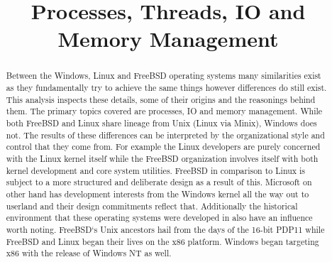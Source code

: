 \documentclass[letterpaper,10pt,draftclsnofoot,onecolumn]{IEEEtran}
\begin{document}
\title{Processes, Threads, IO and Memory Management}

\author{
}

\maketitle
\begin{abstract}
Between the Windows, Linux and FreeBSD operating systems many similarities exist as they fundamentally try to achieve the same things however differences do still exist. This analysis inspects these details, some of their origins and the reasonings behind them. The primary topics covered are processes, IO and memory management. While both FreeBSD and Linux share lineage from Unix (Linux via Minix), Windows does not. The results of these differences can be interpreted by the organizational style and control that they come from. For example the Linux developers are purely concerned with the Linux kernel itself while the FreeBSD organization involves itself with both kernel development and core system utilities. FreeBSD in comparison to Linux is subject to a more structured and deliberate design as a result of this. Microsoft on other hand has development interests from the Windows kernel all the way out to userland and their design commitments reflect that. Additionally the historical environment that these operating systems were developed in also have an influence worth noting. FreeBSD`s Unix ancestors hail from the days of the 16-bit PDP11 while FreeBSD and Linux began their lives on the x86 platform. Windows began targeting x86 with the release of Windows NT as well.
\end{abstract}
\pagebreak

\tableofcontents
\pagebreak
\end{document}
